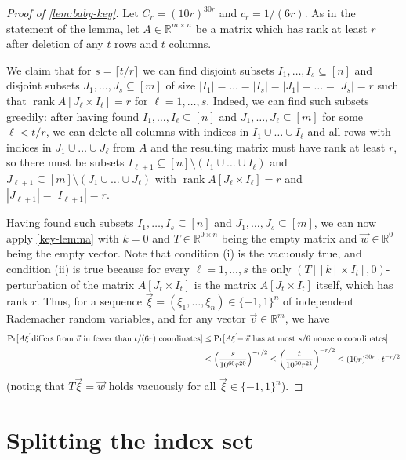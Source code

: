 \documentclass[english]{article}
\theoremstyle{remark}
\numberwithin{equation}{section}
\numberwithin{figure}{section}
\newcommand{\su}{\subseteq}
\newcommand{\RR}{\mathbb{R}}
\newcommand{\rank}{\operatorname{rank}}
\let\originalleft\left
\let\originalright\right
\renewcommand{\left}{\mathopen{}\mathclose\bgroup\originalleft}
\renewcommand{\right}{\aftergroup\egroup\originalright}
\begin{document}
\begin{proof}[Proof of \cref{lem:baby-key}]
    Let $C_r=(10r)^{30r}$ and $c_r=1/(6r)$. As in the statement of the lemma, let $A\in \RR ^{m\times n}$ be a matrix which has rank at least $r$ after deletion of any $t$ rows and $t$ columns.
    
    We claim that for $s=\lceil t/r\rceil$ we can find disjoint subsets $I_1,\dots,I_s\su [n]$ and disjoint subsets $J_1,\dots,J_s\su [m]$ of size $|I_1|=\dots=|I_s|=|J_1|=\dots=|J_s|=r$ such that $\rank A[J_\ell \times I_\ell]=r$ for $\ell=1,\dots,s$. Indeed, we can find such subsets greedily: after having found $I_1,\dots,I_\ell\su [n]$ and $J_1,\dots,J_\ell\su [m]$ for some $\ell<t/r$, we can delete all columns with indices in $I_1\cup \dots \cup I_\ell$ and all rows with indices in $J_1\cup \dots \cup J_\ell$ from $A$ and the resulting matrix must have rank at least $r$, so there must be subsets $I_{\ell+1}\su  [n]\setminus (I_1\cup \dots \cup I_\ell)$ and $J_{\ell+1}\su  [m]\setminus (J_1\cup \dots \cup J_\ell)$ with $\rank A[J_\ell \times I_\ell]=r$ and $|J_{\ell+1}|=|I_{\ell+1}|=r$.

    Having found such subsets $I_1,\dots,I_s\su [n]$ and $J_1,\dots,J_s\su [m]$, we can now apply \cref{key-lemma} with $k=0$ and $T\in \RR ^{0\times n}$ being the empty matrix and $\vec w\in \RR ^{0}$ being the empty vector. Note that condition (i) is the vacuously true, and condition (ii) is true because for every $\ell=1,\dots,s$ the only $(T[[k]\times I_t],0)$-perturbation of the matrix $A[J_t\times I_t]$ is the matrix $A[J_t\times I_t]$ itself, which has rank $r$. Thus, for a sequence $\vec{\xi}=(\xi_{1},\dots,\xi_{n})\in\{-1,1\}^{n}$ of independent Rademacher random variables, and for any vector $\vec v\in \RR^m$, we have
\begin{align*}
\Pr[A\vec{\xi}\text{ differs from }\vec{v}\text{ in fewer than }t/(6r)\text{ coordinates}]&\le \Pr[A\vec{\xi}-\vec{v}\text{ has at most }s/6\text{ nonzero coordinates}]\\
&\le\left(\frac{s}{10^{60}r^{20}}\right)^{-r/2}\le \left(\frac{t}{10^{60}r^{21}}\right)^{-r/2}\le (10r)^{30r}\cdot t^{-r/2}
\end{align*}
(noting that $T\vec{\xi}=\vec{w}$ holds vacuously for all $\vec{\xi}\in\{-1,1\}^{n}$).
\end{proof}

\section{Splitting the index set}\label{sec:splitting}
\end{document}
